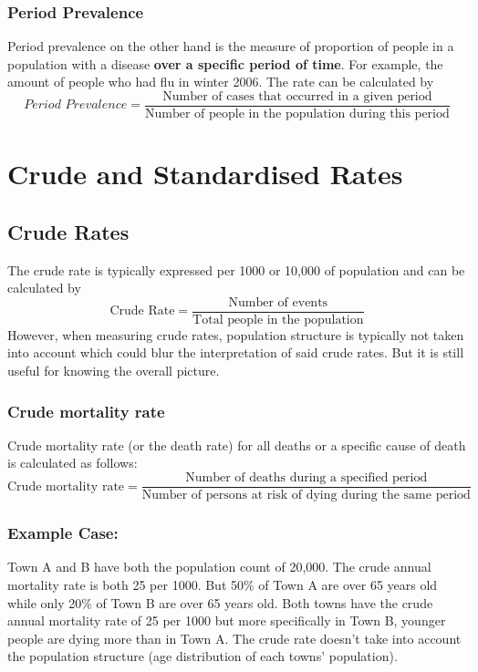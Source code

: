 \documentclass{article}
\begin{document}
\subsubsection{Period Prevalence}
Period prevalence on the other hand is the measure of proportion of people in a population with a disease \textbf{over a
specific period of time}. For example, the amount of people who had flu in winter 2006. The rate can be calculated by
\begin{equation*}
    \textit{Period Prevalence} = \frac{\text{Number of cases that occurred in a given period}}{\text{Number of people in the population during this period}}
\end{equation*}


\pagebreak
\section{Crude and Standardised Rates}
\subsection{Crude Rates}
The crude rate is typically expressed per 1000 or 10,000 of population and can be calculated by
\begin{equation}
    \text{Crude Rate} = \frac{\text{Number of events}}{\text{Total people in the population}}
\end{equation}
However, when measuring crude rates, population structure is typically not taken into account which could
blur the interpretation of said crude rates. But it is still useful for knowing the overall picture.

\subsubsection*{Crude mortality rate}
Crude mortality rate (or the death rate) for all deaths or a specific cause of death is calculated as follows:
\begin{equation*}
    \text{Crude mortality rate} = \dfrac{\text{Number of deaths during a specified period}}{\text{Number of persons at risk of dying during the same period}}
\end{equation*}

\subsubsection*{Example Case:}
Town A and B have both the population count of 20,000. The crude annual mortality rate is both 25 per 1000.
But 50\% of Town A are over 65 years old while only 20\% of Town B are over 65 years old. Both towns have
the crude annual mortality rate of 25 per 1000 but more specifically in Town B, younger people are dying
more than in Town A. The crude rate doesn't take into account the population structure (age distribution of
each towns' population).
\end{document}
